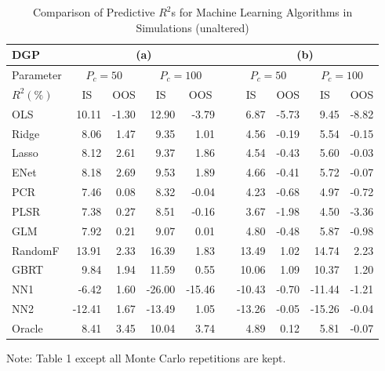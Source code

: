 \documentclass[]{article}
\begin{document}
\begin{table}[ht]
\begin{threeparttable}
\centering
\setlength{\tabcolsep}{6pt}
\caption{Comparison of Predictive $R^2$s for Machine Learning Algorithms in Simulations (unaltered)}
\begin{tabular}{lrrrrcrrrr}
DGP & \multicolumn{4}{c}{(a)} && \multicolumn{4}{c}{(b)} \\
\hline\noalign{\smallskip}
Parameter & \multicolumn{2}{c}{$P_c = 50$} & \multicolumn{2}{c}{$P_c = 100$}& & \multicolumn{2}{c}{$P_c = 50$} &  \multicolumn{2}{c}{$P_c = 100$} \\
  \noalign{\smallskip}\hline\noalign{\smallskip}
$R^2(\%)$ & \multicolumn{1}{c}{IS} & \multicolumn{1}{c}{OOS} & \multicolumn{1}{c}{IS} & \multicolumn{1}{c}{OOS} & &\multicolumn{1}{c}{IS} & \multicolumn{1}{c}{OOS} & \multicolumn{1}{c}{IS} & \multicolumn{1}{c}{OOS} \\ 
  \noalign{\smallskip}\hline\noalign{\smallskip}
OLS & 10.11 & -1.30 & 12.90 & -3.79 && 6.87 & -5.73 & 9.45 & -8.82 \\ 
Ridge & 8.06 & 1.47 & 9.35 & 1.01 && 4.56 & -0.19 & 5.54 & -0.15 \\ 
Lasso & 8.12 & 2.61 & 9.37 & 1.86 && 4.54 & -0.43 & 5.60 & -0.03 \\ 
ENet & 8.18 & 2.69 & 9.53 & 1.89 && 4.66 & -0.41 & 5.72 & -0.07 \\ 
PCR & 7.46 & 0.08 & 8.32 & -0.04 && 4.23 & -0.68 & 4.97 & -0.72 \\ 
PLSR & 7.38 & 0.27 & 8.51 & -0.16 && 3.67 & -1.98 & 4.50 & -3.36 \\ 
GLM & 7.92 & 0.21 & 9.07 & 0.01 && 4.80 & -0.48 & 5.87 & -0.98 \\ 
RandomF & 13.91 & 2.33 & 16.39 & 1.83 && 13.49 & 1.02 & 14.74 & 2.23 \\ 
GBRT & 9.84 & 1.94 & 11.59 & 0.55 && 10.06 & 1.09 & 10.37 & 1.20 \\ 
NN1 & -6.42 & 1.60 & -26.00 & -15.46 && -10.43 & -0.70 & -11.44 & -1.21 \\ 
NN2 & -12.41 & 1.67 & -13.49 & 1.05 && -13.26 & -0.05 & -15.26 & -0.04 \\ 
Oracle & 8.41 & 3.45 & 10.04 & 3.74 && 4.89 & 0.12 & 5.81 & -0.07 \\ 
   \hline
\end{tabular}
\begin{tablenotes}
      \small
      \item Note: Table 1 except all Monte Carlo repetitions are kept.
    \end{tablenotes}
  \end{threeparttable}
\end{table}
\end{document}
